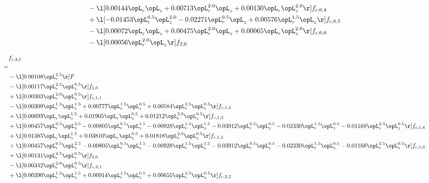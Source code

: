 \begin{alignat}{2}
& - \l[  0.00144 \opL_r \opL_z +  0.00713 \opL_r^{2.0} \opL_z +  0.00130 \opL_r \opL_z^{2.0}  \r] f_{c,6,4} \nonumber \\ 
& + \l[  -0.01453 \opL_r^{0.5} \opL_z^{2.0}   -0.02271 \opL_r^{0.5} \opL_z +  0.00576 \opL_r^{1.5} \opL_z  \r] f_{c,6,5} \nonumber \\ 
& - \l[  0.00072 \opL_r \opL_z +  0.00475 \opL_r^{2.0} \opL_z +  0.00065 \opL_r \opL_z^{2.0}  \r] f_{c,6,6} \nonumber \\ 
& - \l[  0.00056 \opL_r^{2.0} \opL_z  \r] f_{2,0} \nonumber \\ 
\end{alignat} 


\begin{alignat}{2} 
\label{eq:f_45_1} 
& f_{c,4,5} \nonumber \\ 
 = \\ 
& - \l[  0.00108 \opL_r^{2.5}  \r] F \nonumber \\ 
& - \l[  0.00117 \opL_r^{2.5} \opL_z^{0.5}  \r] f_{1,0} \nonumber \\ 
& + \l[  0.00303 \opL_r^{2.0} \opL_z^{0.5}  \r] f_{c,1,1} \nonumber \\ 
& - \l[  0.00309 \opL_r^{1.5} \opL_z^{1.5} +  0.00777 \opL_r^{1.5} \opL_z^{0.5} +  0.00584 \opL_r^{2.5} \opL_z^{0.5}  \r] f_{c,1,2} \nonumber \\ 
& + \l[  0.00693 \opL_r \opL_z^{1.5} +  0.01905 \opL_r \opL_z^{0.5} +  0.01212 \opL_r^{2.0} \opL_z^{0.5}  \r] f_{c,1,3} \nonumber \\ 
& + \l[  0.00457 \opL_r^{0.5} \opL_z^{2.5}   -0.00805 \opL_r^{0.5} \opL_z^{1.5}   -0.00928 \opL_r^{1.5} \opL_z^{1.5}   -0.03912 \opL_r^{0.5} \opL_z^{0.5}   -0.02330 \opL_r^{1.5} \opL_z^{0.5}   -0.01168 \opL_r^{2.5} \opL_z^{0.5}  \r] f_{c,1,4} \nonumber \\ 
& + \l[  0.01385 \opL_r \opL_z^{1.5} +  0.03810 \opL_r \opL_z^{0.5} +  0.01818 \opL_r^{2.0} \opL_z^{0.5}  \r] f_{c,1,5} \nonumber \\ 
& + \l[  0.00457 \opL_r^{0.5} \opL_z^{2.5}   -0.00805 \opL_r^{0.5} \opL_z^{1.5}   -0.00928 \opL_r^{1.5} \opL_z^{1.5}   -0.03912 \opL_r^{0.5} \opL_z^{0.5}   -0.02330 \opL_r^{1.5} \opL_z^{0.5}   -0.01168 \opL_r^{2.5} \opL_z^{0.5}  \r] f_{c,1,6} \nonumber \\ 
& + \l[  0.00131 \opL_r^{2.5} \opL_z^{0.5}  \r] f_{3,0} \nonumber \\ 
& - \l[  0.00342 \opL_r^{2.0} \opL_z^{0.5}  \r] f_{c,3,1} \nonumber \\ 
& + \l[  0.00390 \opL_r^{1.5} \opL_z^{1.5} +  0.00914 \opL_r^{1.5} \opL_z^{0.5} +  0.00655 \opL_r^{2.5} \opL_z^{0.5}  \r] f_{c,3,2} \nonumber \\ 

\end{alignat}
